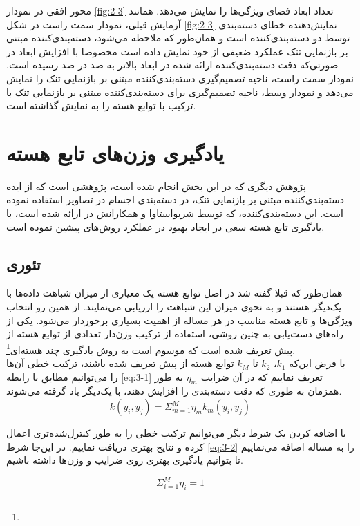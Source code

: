 \documentclass[12pt,twocolumn]{article}
\newcommand{\enfootnote}[1]{\footnote{\lr{#1}}}
\begin{document}
محور افقی در نمودار \ref{fig:2-3} تعداد ابعاد فضای ویژگی‌ها را نمایش می‌دهد. همانند آزمایش قبلی، نمودار سمت راست در شکل \ref{fig:2-3} نمایش‌دهنده خطای دسته‌بندی توسط دو دسته‌بندی‌کننده است و همان‌طور که ملاحظه می‌شود، دسته‌بندی‌کننده مبتنی بر بازنمایی تنک عملکرد ضعیفی از خود نمایش داده است مخصوصا با افزایش ابعاد در صورتی‌که دقت دسته‌بندی‌کننده ارائه شده در ابعاد بالاتر به صد در صد رسیده است. نمودار سمت راست، ناحیه تصمیم‌گیری دسته‌بندی‌کننده مبتنی بر بازنمایی تنک را نمایش می‌دهد و نمودار وسط، ناحیه تصمیم‌گیری برای دسته‌بندی‌کننده مبتنی بر بازنمایی تنک با ترکیب با توابع هسته را به نمایش گذاشته است. 

\section{یادگیری وزن‌های تابع هسته}
پژوهش دیگری که در این بخش انجام شده است، پژوهشی است که از ایده دسته‌بندی‌کننده مبتنی بر بازنمایی تنک، در دسته‌بندی اجسام در تصاویر استفاده نموده است. این دسته‌بندی‌کننده، که توسط شریواستاوا و همکارانش در \cite{shrivastava2014multiple} ارائه شده است، با یادگیری تابع هسته سعی در ایجاد بهبود در عملکرد روش‌های پیشین نموده است.

\subsection{تئوری}
همان‌طور که قبلا گفته شد در اصل توابع هسته یک معیاری از میزان شباهت داده‌ها با یک‌دیگر هستند و به نحوی میزان این شباهت را ارزیابی می‌نمایند. از همین رو انتخاب ویژگی‌ها و تابع هسته مناسب در هر مساله از اهمیت بسیاری برخوردار می‌شود. یکی از راه‌های دست‌یابی به چنین روشی، استفاده از ترکیب وزن‌دار تعدادی از توابع هسته از پیش تعریف شده است که موسوم است به روش یادگیری چند هسته‌ای\enfootnote{Multiple Kernel Learning (MKL)}. 
\\
با فرض این‌که $k_1$،  $k_2$ تا $k_M$ توابع هسته از پیش تعریف شده باشند، ترکیب خطی آن‌ها را می‌توانیم مطابق با رابطه \eqref{eq:3-1} تعریف نماییم که در آن ضرایب $\eta_m$ به طور همزمان به طوری که دقت دسته‌بندی را افزایش دهند، با یک‌دیگر یاد گرفته می‌شوند.
\begin{equation}
k(y_i,y_j) = \Sigma_{m = 1}^M \eta_mk_m(y_i,y_j)
\label{eq:3-1}
\end{equation}
 
با اضافه کردن یک شرط دیگر می‌توانیم ترکیب خطی را به طور کنترل‌شده‌تری اعمال کرده و نتایج بهتری دریافت نماییم. در این‌جا شرط \eqref{eq:3-2} را به مساله اضافه می‌نماییم تا بتوانیم یادگیری بهتری روی ضرایب و وزن‌ها داشته باشیم.

\begin{equation}
\Sigma_{i=1}^M \eta_i = 1
\label{eq:3-2}
\end{equation}
\end{document}

